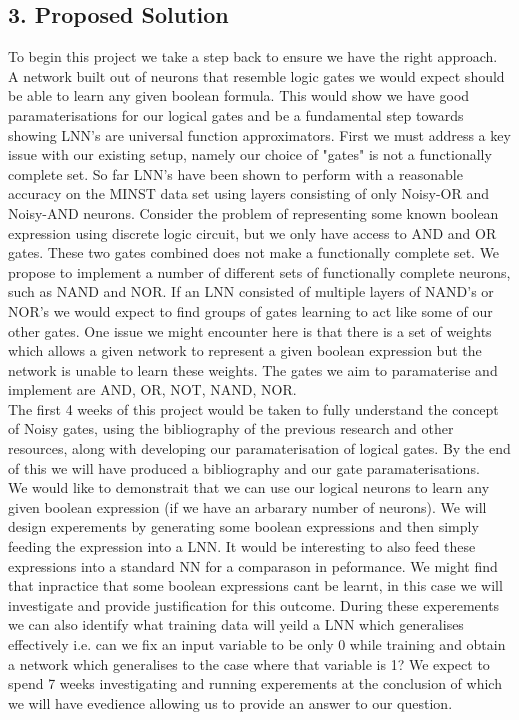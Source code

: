\begin{appendices}
\section*{3. Proposed Solution}

To begin this project we take a step back to ensure we have the right approach. A network built out of neurons that resemble logic gates we would expect should be able to learn any given boolean formula. This would show we have good paramaterisations for our logical gates and be a fundamental step towards showing LNN's are universal function approximators. First we must address a key issue with our existing setup, namely our choice of "gates" is not a functionally complete set. So far LNN's have been shown to perform with a reasonable accuracy on the MINST data set using layers consisting of only Noisy-OR and Noisy-AND neurons. Consider the problem of representing some known boolean expression using discrete logic circuit, but we only have access to AND and OR gates. These two gates combined does not make a functionally complete set. We propose to implement a number of different sets of functionally complete neurons, such as NAND and NOR. If an LNN consisted of multiple layers of NAND's or NOR's we would expect to find groups of gates learning to act like some of our other gates. One issue we might encounter here is that there is a set of weights which allows a given network to represent a given boolean expression but the network is unable to learn these weights. The gates we aim to paramaterise and implement are AND, OR, NOT, NAND, NOR. \\

The first 4 weeks of this project would be taken to fully understand the concept of Noisy gates, using the bibliography of the previous research and other resources, along with developing our paramaterisation of logical gates. By the end of this we will have produced a bibliography and our gate paramaterisations.\\

We would like to demonstrait that we can use our logical neurons to learn any given boolean expression (if we have an arbarary number of neurons). We will design experements by generating some boolean expressions and then simply feeding the expression into a LNN. It would be interesting to also feed these expressions into a standard NN for a comparason in peformance. We might find that inpractice that some boolean expressions cant be learnt, in this case we will investigate and provide justification for this outcome. During these experements we can also identify what training data will yeild a LNN which generalises effectively i.e. can we fix an input variable to be only 0 while training and obtain a network which generalises to the case where that variable  is 1? We expect to spend 7 weeks investigating and running experements at the conclusion of which we will have evedience allowing us to provide an answer to our question.


\end{appendices}
